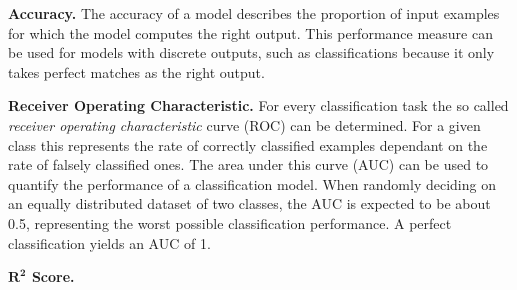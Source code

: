\textbf{Accuracy.} The accuracy of a model describes the proportion of input
examples for which the model computes the right output. This performance
measure can be used for models with discrete outputs, such as classifications
because it only takes perfect matches as the right output.

\textbf{Receiver Operating Characteristic.} For every classification task the
so called \textit{receiver operating characteristic} curve (ROC) can be
determined. For a given class this represents the rate of correctly classified
examples dependant on the rate of falsely classified ones. The area under this
curve (AUC) can be used to quantify the performance of a classification model.
When randomly deciding on an equally distributed dataset of two classes, the
AUC is expected to be about \num{0.5}, representing the worst possible
classification performance. A perfect classification yields an AUC of \num{1}.

\textbf{$\symbf{R^2}$ Score.} \blindtext
